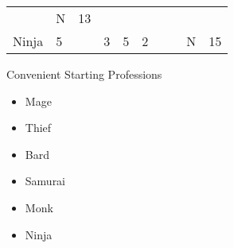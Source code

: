 \documentclass[12pt]{article}
\newcommand{\WviiTwoColumnSetup}{\raggedcolumns\RaggedRight}
\begin{document}
\begin{longtable}[]{@{}llllllllll@{}}
\begin{minipage}[t]{0.06\columnwidth}\raggedright\strut
\strut\end{minipage} &
\begin{minipage}[t]{0.07\columnwidth}\raggedright\strut
N
\strut\end{minipage} &
\begin{minipage}[t]{0.08\columnwidth}\raggedright\strut
13
\strut\end{minipage}\tabularnewline
\begin{minipage}[t]{0.13\columnwidth}\raggedright\strut
Ninja
\strut\end{minipage} &
\begin{minipage}[t]{0.06\columnwidth}\raggedright\strut
5
\strut\end{minipage} &
\begin{minipage}[t]{0.06\columnwidth}\raggedright\strut
\strut\end{minipage} &
\begin{minipage}[t]{0.06\columnwidth}\raggedright\strut
3
\strut\end{minipage} &
\begin{minipage}[t]{0.06\columnwidth}\raggedright\strut
5
\strut\end{minipage} &
\begin{minipage}[t]{0.06\columnwidth}\raggedright\strut
2
\strut\end{minipage} &
\begin{minipage}[t]{0.06\columnwidth}\raggedright\strut
\strut\end{minipage} &
\begin{minipage}[t]{0.06\columnwidth}\raggedright\strut
\strut\end{minipage} &
\begin{minipage}[t]{0.07\columnwidth}\raggedright\strut
N
\strut\end{minipage} &
\begin{minipage}[t]{0.08\columnwidth}\raggedright\strut
15
\strut\end{minipage}\tabularnewline
\bottomrule
\end{longtable}

Convenient Starting Professions

\begin{multicols}{2}\WviiTwoColumnSetup
\begin{itemize}
\item
  Mage
\item
  Thief
\item
  Bard
\item
  Samurai
\item
  Monk
\item
  Ninja
\end{itemize}
\end{multicols}
\end{document}
